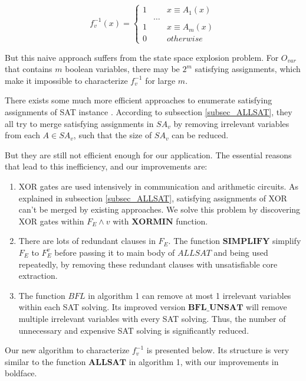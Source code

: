 \documentclass[journal]{IEEEtran}
\begin{document}
\begin{equation}\label{fneg1v}
f^{-1}_v(x) = \left\{ \begin{array}{lll}
1 & & x\equiv A_1(x) \\
  & \dots &  \\
1 & & x\equiv A_m(x) \\
0 & & otherwise
\end{array}
\right.
\end{equation}

But this naive approach suffers from the state space explosion problem.
For $O_{var}$ that contains $m$ boolean variables,
there may be $2^m$ satisfying assignments,
which make it impossible to characterize $f^{-1}_v$ for large $m$.

There exists  some much more efficient approaches
to enumerate satisfying assignments of SAT instance
\cite{PRIMECLAUSE,SATUNBMC,MINASS,EFFCON,MINCEX,MEMEFFALLSAT,REPARAM,EFFSATUSMCCO}.
According to subsection \ref{subsec_ALLSAT},
they all try to merge satisfying assignments in $SA_v$ by removing irrelevant variables from each $A\in SA_v$,
such that the size of $SA_v$ can be reduced.

But they are still not efficient enough for our application.
The essential reasons that lead to this inefficiency,
and our improvements are:
\begin{enumerate}
\item XOR gates are used intensively in communication and arithmetic circuits.
As explained in subsection \ref{subsec_ALLSAT},
satisfying assignments of XOR can't be merged by existing approaches.
We solve this problem by discovering XOR gates within $F_E\wedge v$ with $\boldsymbol{XORMIN}$ function.
\item There are lots of redundant clauses in $F_E$.
The function $\boldsymbol{SIMPLIFY}$ simplify $F_E$ to $F_E^v$ before passing it to main body of $ALLSAT$ and being used repeatedly,
by removing these redundant clauses with unsatisfiable core extraction.
\item The function $BFL$ in algorithm 1 can remove at most 1 irrelevant variables within each SAT solving. Its improved version $\boldsymbol{BFL\_UNSAT}$ will remove multiple irrelevant variables with every SAT solving. Thus, the number of unnecessary and expensive SAT solving is significantly reduced.
\end{enumerate}

Our new algorithm to characterize $f^{-1}_v$ is presented below.
Its structure is very similar to the function $\boldsymbol{ALLSAT}$ in algorithm 1,
with our improvements in boldface.
\end{document}
